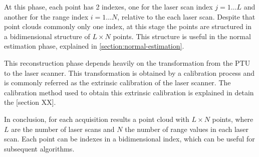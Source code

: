At this phase, each point has 2 indexes, one for the laser scan index $j=1\dots L$ and another for the range index $i=1\dots N$, relative to the each laser scan. Despite that point clouds commonly only one index, at this stage the points are structured in a bidimensional structure of $L \times N$ points. This structure is useful in the normal estimation phase, explained in \cref{section:normal-estimation}.

This reconstruction phase depends heavily on the transformation from the PTU to the laser scanner. This transformation is obtained by a calibration process and is commonly referred as the extrinsic calibration of the laser scanner. The calibration method used to obtain this extrinsic calibration is explained in detain the [section XX].

In conclusion, for each acquisition results a point cloud with $L \times N$ points, where $L$ are the number of laser scans and $N$ the number of range values in each laser scan. Each point can be indexes in a bidimensional index, which can be useful for subsequent algorithms.
